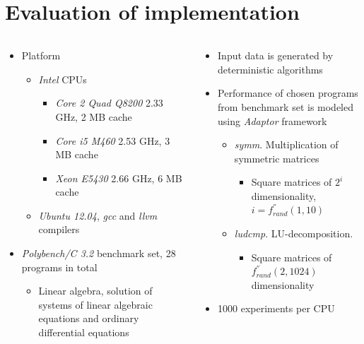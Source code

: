 \documentclass{beamer}
\begin{document}
\section{Evaluation of implementation}
	\begin{columns}
		\begin{column}{0.5\textwidth}
			\begin{itemize}
				\item Platform
				\begin{itemize}
					\item \textit{Intel} CPUs
					\begin{itemize}
						\item \textit{Core 2 Quad Q8200} 2.33 GHz, 2 MB cache
						\item \textit{Core i5 M460} 2.53 GHz, 3 MB cache
						\item \textit{Xeon E5430} 2.66 GHz, 6 MB cache
					\end{itemize}
					\item \textit{Ubuntu 12.04}, \textit{gcc} and \textit{llvm} compilers
				\end{itemize}

				\item \textit{Polybench/C 3.2} benchmark set, 28 programs in total
				\begin{itemize}
					\item Linear algebra, solution of systems of linear algebraic equations and ordinary differential equations
				\end{itemize}
			\end{itemize}
		\end{column}
		\begin{column}{0.5\textwidth}
			\begin{itemize}
				\item Input data is generated by deterministic algorithms	
				\item Performance of chosen programs from benchmark set is modeled using \textit{Adaptor} framework
				\begin{itemize}
					\item \textit{symm}. Multiplication of symmetric matrices
					\begin{itemize}
						\item Square matrices of $2^i$ dimensionality, $i = f^{''}_{rand}(1,10)$
					\end{itemize}
				
					\item \textit{ludcmp}. LU-decomposition.
					\begin{itemize}
						\item Square matrices of $f^{''}_{rand}(2,1024)$ dimensionality
					\end{itemize}
				\end{itemize}
				
				\item 1000 experiments per CPU
			\end{itemize}
		\end{column}
	\end{columns}
\end{document}
